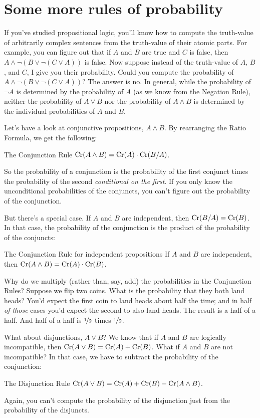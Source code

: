 \section{Some more rules of probability}

If you've studied propositional logic, you'll know how to compute the
truth-value of arbitrarily complex sentences from the truth-value of their
atomic parts. For example, you can figure out that if $A$ and $B$ are true and
$C$ is false, then $A \land \neg (B \lor \neg(C \lor A))$ is false. Now suppose
instead of the truth-value of $A$, $B$, and $C$, I give you their probability.
Could you compute the probability of
$A \land \neg (B \lor \neg(C \lor A))$? The answer is no. In general, while the
probability of $\neg A$ is determined by the probability of $A$ (as we know from
the Negation Rule), neither the probability of $A\lor B$ nor the probability of
$A \land B$ is determined by the individual probabilities of $A$ and $B$.

Let's have a look at conjunctive propositions, $A \land B$. By
rearranging the Ratio Formula, we get the following:
%
\begin{genericthm}{The Conjunction Rule}
  $\text{Cr}(A \land B) = \text{Cr}(A) \cdot \text{Cr}(B / A)$.
\end{genericthm}
%
So the probability of a conjunction is the probability of the first
conjunct times the probability of the second \emph{conditional on the
  first}. If you only know the unconditional probabilities of the
conjuncts, you can't figure out the probability of the conjunction.

But there's a special case. If $A$ and $B$ are independent,
then $\text{Cr}(B/A) = \text{Cr}(B)$. In that case, the probability of the
conjunction is the product of the probability of the conjuncts:
%
\begin{genericthm}{The Conjunction Rule for independent propositions}
  If $A$ and $B$ are independent, then $\text{Cr}(A \land B) = \text{Cr}(A) \cdot
  \text{Cr}(B)$.
\end{genericthm}

Why do we multiply (rather than, say, add) the probabilities in the Conjunction
Rules? Suppose we flip two coins. What is the probability that they both land
heads? You'd expect the first coin to land heads about half the time; and in
half \emph{of those} cases you'd expect the second to also land heads. The
result is a half of a half. And half of a half is
$\nicefrac{1}{2}$ times $\nicefrac{1}{2}$.

What about disjunctions, $A \lor B$? We know that if $A$ and $B$ are
logically incompatible, then $\text{Cr}(A \lor B) = \text{Cr}(A) + \text{Cr}(B)$.
What if $A$ and $B$ are not incompatible? In that case, we have to
subtract the probability of the conjunction:
%
\begin{genericthm}{The Disjunction Rule}
  $\text{Cr}(A \lor B) = \text{Cr}(A) + \text{Cr}(B) - \text{Cr}(A\land B)$.
\end{genericthm}
%
\noindent%
Again, you can't compute the probability of the disjunction just from
the probability of the disjuncts.

